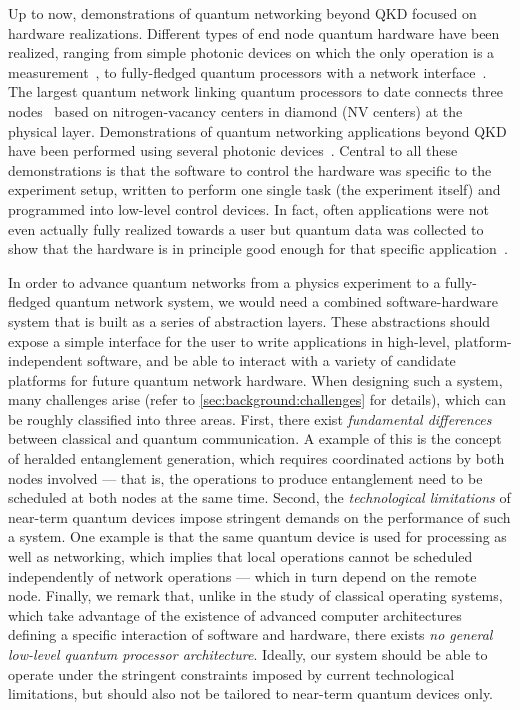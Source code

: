 Up to now, demonstrations of quantum networking beyond QKD focused on hardware realizations.
Different types of end node quantum hardware have been realized, ranging from simple photonic
devices on which the only operation is a measurement~\cite{vallone_2015_satellite,
yin_2017_satellite}, to fully-fledged quantum processors with a network
interface~\cite{bernien_2013_heralded, humphreys_2018_delivery, pompili_2021_multinode,
moehring_2007_ion_traps, reiserer_2015_neutral_atoms}. The largest quantum network linking quantum
processors to date connects three nodes~\cite{pompili_2021_multinode} based on nitrogen-vacancy
centers in diamond (NV centers) at the physical layer. Demonstrations of quantum networking
applications beyond QKD have been performed using several photonic
devices~\cite{barz_2012_demonstration, thalacker_2019_anonymous, bozzio_2020_coin,
ng_2012_noisystorage}. Central to all these demonstrations is that the software to control the
hardware was specific to the experiment setup, written to perform one single task (the experiment
itself) and programmed into low-level control devices. In fact, often applications were not even
actually fully realized towards a user but quantum data was collected to show that the hardware is
in principle good enough for that specific application~\cite{zhang_2022_diqkd,
liu_2022_photonic_diqkd}.

In order to advance quantum networks from a physics experiment to a fully-fledged quantum network
system, we would need a combined software-hardware system that is built as a series of abstraction
layers. These abstractions should expose a simple interface for the user to write applications in
high-level, platform-independent software, and be able to interact with a variety of candidate
platforms for future quantum network hardware. When designing such a system, many challenges arise
(refer to \cref{sec:background:challenges} for details), which can be roughly classified into three
areas. First, there exist \emph{fundamental differences} between classical and quantum
communication. A example of this is the concept of heralded entanglement generation, which requires
coordinated actions by both nodes involved --- that is, the operations to produce entanglement need
to be scheduled at both nodes at the same time. Second, the \emph{technological limitations} of
near-term quantum devices impose stringent demands on the performance of such a system. One example
is that the same quantum device is used for processing as well as networking, which implies that
local operations cannot be scheduled independently of network operations --- which in turn depend on
the remote node. Finally, we remark that, unlike in the study of classical operating systems, which
take advantage of the existence of advanced computer architectures defining a specific interaction
of software and hardware, there exists \emph{no general low-level quantum processor architecture}.
Ideally, our system should be able to operate under the stringent constraints imposed by current
technological limitations, but should also not be tailored to near-term quantum devices only.


